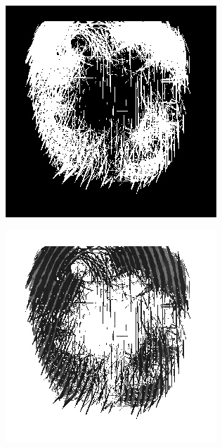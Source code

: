 \documentclass{beamer}
\begin{document}
{\begin{figure}[!ht]
\begin{subfigure}[ht]{0.15\textwidth}
        \end{subfigure}
        \qquad
        \begin{subfigure}[ht]{0.15\textwidth}
            \includegraphics[width=\textwidth]{fingerprints/2002Db3a/1_1_mask.jpg}
        \end{subfigure}
        \qquad
        \begin{subfigure}[ht]{0.15\textwidth}
            \includegraphics[width=\textwidth]{fingerprints/2002Db3a/1_1_filtered.jpg}

\end{subfigure}
\end{figure}}
\end{document}

